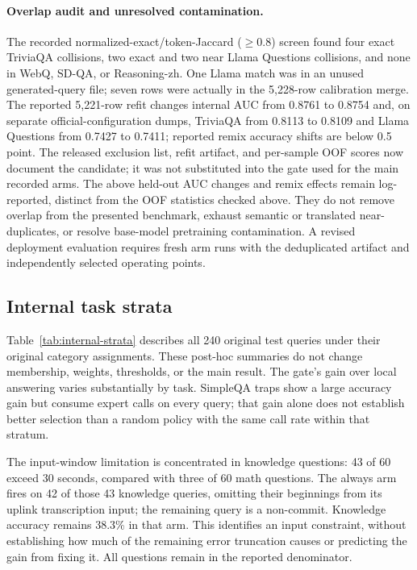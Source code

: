 \paragraph{Overlap audit and unresolved contamination.}
The recorded normalized-exact/token-Jaccard ($\geq0.8$) screen found
four exact TriviaQA collisions, two exact and two near Llama Questions
collisions, and none in WebQ, SD-QA, or Reasoning-zh. One Llama match
was in an unused generated-query file; seven rows were actually in
the 5,228-row calibration merge. The reported 5,221-row refit changes
internal AUC from 0.8761 to 0.8754 and, on separate official-configuration
dumps, TriviaQA from 0.8113 to 0.8109 and Llama Questions from 0.7427
to 0.7411; reported remix accuracy shifts are below 0.5 point.
The released exclusion list, refit artifact, and per-sample OOF scores
now document the candidate; it was not substituted into the gate used
for the main recorded arms. The above held-out AUC changes and remix
effects remain log-reported, distinct from the OOF statistics checked
above. They do not remove overlap
from the presented benchmark, exhaust semantic or translated
near-duplicates, or resolve base-model pretraining contamination.
A revised deployment evaluation requires fresh arm runs with the
deduplicated artifact and independently selected operating points.

\subsection{Internal task strata}
\label{app:internal-strata}
Table~\ref{tab:internal-strata} describes all 240 original test queries
under their original category assignments. These post-hoc summaries
do not change membership, weights, thresholds, or the main result.
The gate's gain over local answering varies substantially by task.
SimpleQA traps show a large accuracy gain but consume expert calls
on every query; that gain alone does not establish better selection
than a random policy with the same call rate within that stratum.



The input-window limitation is concentrated in knowledge questions:
43 of 60 exceed 30 seconds, compared with three of 60 math questions.
The always arm fires on 42 of those 43 knowledge queries, omitting
their beginnings from its uplink transcription input; the remaining
query is a non-commit. Knowledge accuracy remains 38.3\% in that arm.
This identifies an input constraint, without establishing how much
of the remaining error truncation causes or predicting the gain from
fixing it. All questions remain in the reported denominator.

